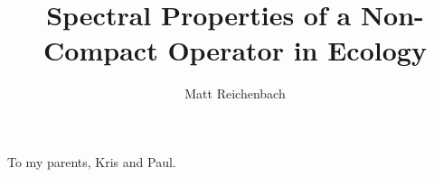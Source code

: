 \documentclass[final]{nuthesis}
\theoremstyle{definition}
\numberwithin{theorem}{section}
\numberwithin{lemma}{section}
\numberwithin{corollary}{section}
\numberwithin{definition}{section}
\numberwithin{equation}{section}
\begin{document}
\frontmatter

\title{Spectral Properties of a Non-Compact Operator in Ecology}
\author{Matt Reichenbach}
\maketitle



\begin{dedication}
    \begin{center}
    	To my parents, Kris and Paul.
    \end{center}
\end{dedication}
\end{document}

